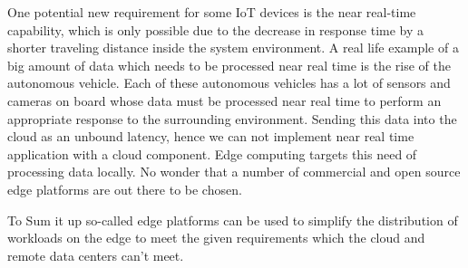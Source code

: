 \bigskip
One potential new requirement for some IoT devices is the near real-time capability, which is only possible due to the decrease in response time by a shorter traveling distance inside the system environment. A real life example of a big amount of data which needs to be processed near real time is the rise of the autonomous vehicle. Each of these autonomous vehicles has a lot of sensors and cameras on board whose data must be processed near real time to perform an appropriate response to the surrounding environment. Sending this data into the cloud as an unbound latency, hence we can not implement near real time application with a cloud component. Edge computing targets this need of processing data locally. No wonder that a number of commercial and open source edge platforms are out there to be chosen. 

\bigskip
To Sum it up so-called edge platforms can be used to simplify the distribution of workloads on the edge to meet the given requirements which the cloud and remote data centers can’t meet. 
